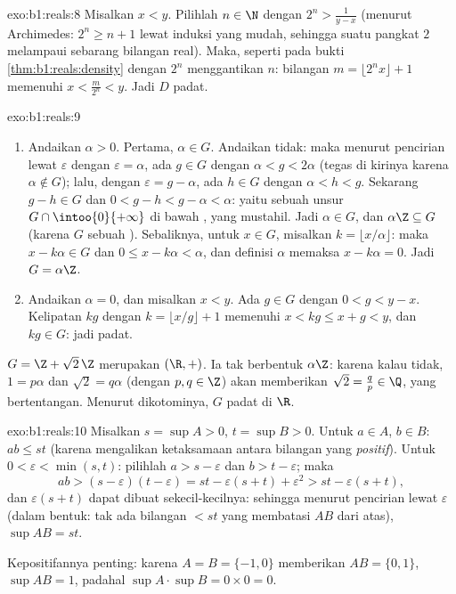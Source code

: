 \begin{solution}{exo:b1:reals:8}
Misalkan $x < y$. Pilihlah $n \in \N$ dengan $2^n > \frac{1}{y - x}$ (menurut Archimedes:
$2^n \geq n + 1$ lewat induksi yang mudah, sehingga suatu pangkat $2$ melampaui
sebarang bilangan real). Maka, seperti pada bukti \cref{thm:b1:reals:density} dengan
$2^n$ menggantikan $n$: bilangan $m = \lfloor 2^n x \rfloor + 1$ memenuhi $x <
\frac{m}{2^n} < y$. Jadi $D$ padat.
\end{solution}

\begin{solution}{exo:b1:reals:9}
\begin{enumerate}
  \item Andaikan $\alpha > 0$. Pertama, $\alpha \in G$. Andaikan tidak: maka
        menurut pencirian  lewat $\varepsilon$ dengan
        $\varepsilon = \alpha$, ada $g \in G$ dengan $\alpha < g <
        2\alpha$ (tegas di kirinya karena $\alpha \notin G$); lalu,
        dengan $\varepsilon = g - \alpha$, ada $h \in G$ dengan
        $\alpha < h < g$. Sekarang $g - h \in G$ dan $0 < g - h < g -
        \alpha < \alpha$: yaitu sebuah unsur $G \cap \intoo{0}{+\infty}$
        di bawah , yang mustahil. Jadi $\alpha \in G$, dan $\alpha\Z
        \subseteq G$ (karena $G$ sebuah ). Sebaliknya, untuk $x \in G$, misalkan
        $k = \lfloor x/\alpha \rfloor$: maka $x - k\alpha \in G$ dan
        $0 \leq x - k\alpha < \alpha$, dan definisi $\alpha$
        memaksa $x - k\alpha = 0$. Jadi $G = \alpha\Z$.
  \item Andaikan $\alpha = 0$, dan misalkan $x < y$. Ada $g \in G$
        dengan $0 < g < y - x$. Kelipatan $kg$ dengan $k = \lfloor x/g
        \rfloor + 1$ memenuhi $x < kg \leq x + g < y$, dan $kg \in
        G$: jadi padat.
\end{enumerate}
 $G = \Z + \sqrt 2\,\Z$ merupakan  $(\R, +)$. Ia tak berbentuk
$\alpha\Z$: karena kalau tidak, $1 = p\alpha$ dan $\sqrt 2 = q\alpha$
(dengan $p, q \in \Z$) akan memberikan $\sqrt 2 = \frac qp \in \Q$,
yang bertentangan. Menurut dikotominya, $G$ padat di $\R$.
\end{solution}

\begin{solution}{exo:b1:reals:10}
Misalkan $s = \sup A > 0$, $t = \sup B > 0$. Untuk $a \in A$, $b \in B$: $ab
\leq st$ (karena mengalikan ketaksamaan antara bilangan yang \emph{positif}).
Untuk $0 < \varepsilon < \min(s, t)$: pilihlah $a > s - \varepsilon$ dan
$b > t - \varepsilon$; maka
\[
ab > (s - \varepsilon)(t - \varepsilon)
= st - \varepsilon(s + t) + \varepsilon^2
> st - \varepsilon (s + t),
\]
dan $\varepsilon(s+t)$ dapat dibuat sekecil-kecilnya: sehingga menurut pencirian
lewat $\varepsilon$ (dalam bentuk: tak ada bilangan $< st$ yang membatasi
$AB$ dari atas), $\sup AB = st$.

Kepositifannya penting: karena $A = B = \{-1, 0\}$ memberikan $AB = \{0, 1\}$,
$\sup AB = 1$, padahal $\sup A \cdot \sup B = 0 \times 0 = 0$.
\end{solution}

